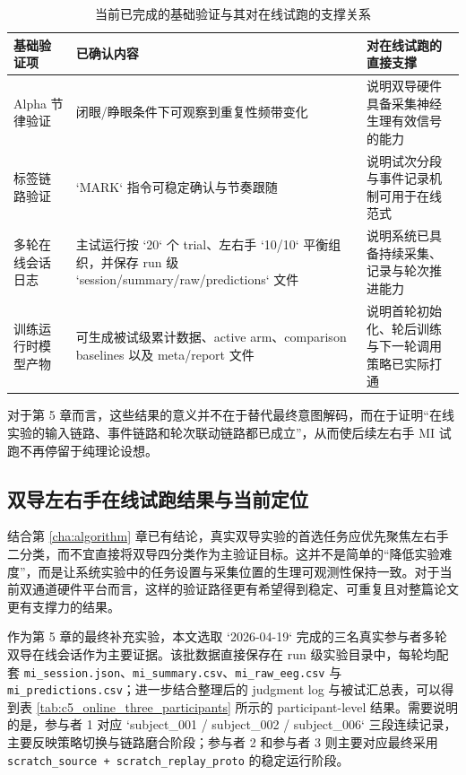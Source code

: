 \begin{table}[htbp]
    \centering
    \caption{当前已完成的基础验证与其对在线试跑的支撑关系}
    \label{tab:c5_online_foundation_map}
    \begin{tabular}{p{3.3cm}p{4.1cm}p{5.6cm}}
        \hline
        基础验证项 & 已确认内容 & 对在线试跑的直接支撑 \\
        \hline
        Alpha 节律验证 & 闭眼/睁眼条件下可观察到重复性频带变化 & 说明双导硬件具备采集神经生理有效信号的能力 \\
        标签链路验证 & `MARK` 指令可稳定确认与节奏跟随 & 说明试次分段与事件记录机制可用于在线范式 \\
        多轮在线会话日志 & 主试运行按 `20` 个 trial、左右手 `10/10` 平衡组织，并保存 run 级 `session/summary/raw/predictions` 文件 & 说明系统已具备持续采集、记录与轮次推进能力 \\
        训练运行时模型产物 & 可生成被试级累计数据、active arm、comparison baselines 以及 meta/report 文件 & 说明首轮初始化、轮后训练与下一轮调用策略已实际打通 \\
        \hline
    \end{tabular}
\end{table}

对于第 5 章而言，这些结果的意义并不在于替代最终意图解码，而在于证明“在线实验的输入链路、事件链路和轮次联动链路都已成立”，从而使后续左右手 MI 试跑不再停留于纯理论设想。

\subsection{双导左右手在线试跑结果与当前定位}

结合第 \ref{cha:algorithm} 章已有结论，真实双导实验的首选任务应优先聚焦左右手二分类，而不宜直接将双导四分类作为主验证目标。这并不是简单的“降低实验难度”，而是让系统实验中的任务设置与采集位置的生理可观测性保持一致。对于当前双通道硬件平台而言，这样的验证路径更有希望得到稳定、可重复且对整篇论文更有支撑力的结果。

作为第 5 章的最终补充实验，本文选取 `2026-04-19` 完成的三名真实参与者多轮双导在线会话作为主要证据。该批数据直接保存在 run 级实验目录中，每轮均配套 \texttt{mi\_session.json}、\texttt{mi\_summary.csv}、\texttt{mi\_raw\_eeg.csv} 与 \texttt{mi\_predictions.csv}；进一步结合整理后的 judgment log 与被试汇总表，可以得到表 \ref{tab:c5_online_three_participants} 所示的 participant-level 结果。需要说明的是，参与者 1 对应 `subject\_001 / subject\_002 / subject\_006` 三段连续记录，主要反映策略切换与链路磨合阶段；参与者 2 和参与者 3 则主要对应最终采用 \texttt{scratch\_source + scratch\_replay\_proto} 的稳定运行阶段。

